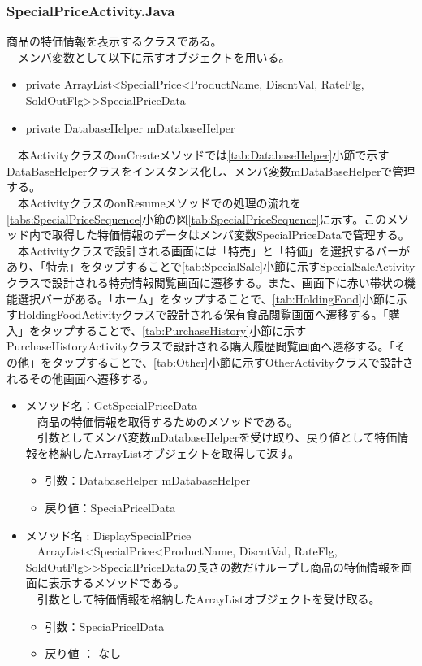 \documentclass[a4j]{jarticle}
\begin{document}
\subsubsection{SpecialPriceActivity.Java}
\label{tab:SpecialPrice}
商品の特価情報を表示するクラスである。\\
　メンバ変数として以下に示すオブジェクトを用いる。
\begin{itemize}
\item private ArrayList\textless  SpecialPrice\textless ProductName, DiscntVal, RateFlg, SoldOutFlg\textgreater \textgreater  SpecialPriceData
\item private DatabaseHelper mDatabaseHelper
\end{itemize}
　本ActivityクラスのonCreateメソッドでは\ref{tab:DatabaseHelper}小節で示すDataBaseHelperクラスをインスタンス化し、メンバ変数mDataBaseHelperで管理する。\\
　本ActivityクラスのonResumeメソッドでの処理の流れを\ref{tabs:SpecialPriceSequence}小節の図\ref{tab:SpecialPriceSequence}に示す。このメソッド内で取得した特価情報のデータはメンバ変数SpecialPriceDataで管理する。\\
　本Activityクラスで設計される画面には「特売」と「特価」を選択するバーがあり、「特売」をタップすることで\ref{tab:SpecialSale}小節に示すSpecialSaleActivityクラスで設計される特売情報閲覧画面に遷移する。また、画面下に赤い帯状の機能選択バーがある。「ホーム」をタップすることで、\ref{tab:HoldingFood}小節に示すHoldingFoodActivityクラスで設計される保有食品閲覧画面へ遷移する。「購入」をタップすることで、\ref{tab:PurchaseHistory}小節に示すPurchaseHistoryActivityクラスで設計される購入履歴閲覧画面へ遷移する。「その他」をタップすることで、\ref{tab:Other}小節に示すOtherActivityクラスで設計されるその他画面へ遷移する。
\begin{itemize}
\item メソッド名：GetSpecialPriceData\\
  　商品の特価情報を取得するためのメソッドである。\\
  　引数としてメンバ変数mDatabaseHelperを受け取り、戻り値として特価情報を格納したArrayListオブジェクトを取得して返す。
  \begin{itemize}
  \item 引数：DatabaseHelper mDatabaseHelper
  \item 戻り値：SpeciaPricelData
  \end{itemize}

\item メソッド名 : DisplaySpecialPrice\\
  　ArrayList\textless  SpecialPrice\textless ProductName, DiscntVal, RateFlg, SoldOutFlg\textgreater \textgreater  SpecialPriceDataの長さの数だけループし商品の特価情報を画面に表示するメソッドである。\\
  　引数として特価情報を格納したArrayListオブジェクトを受け取る。
  \begin{itemize}
  \item 引数：SpeciaPricelData
  \item 戻り値 ： なし
  \end{itemize}
\end{itemize}
\end{document}
